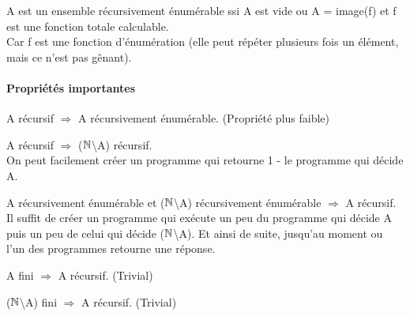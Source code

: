 \begin{myprop}
	A est un ensemble récursivement énumérable ssi A est vide ou A = image(f) et f
	est une fonction totale calculable. \\
	Car f est une fonction d'énumération (elle
	peut répéter plusieurs fois un élément, mais ce n'est pas gênant).
\end{myprop}


\paragraph{Propriétés importantes}
\label{par:propri_t_s_importantes}
\begin{myprop}
	A récursif $\Rightarrow$ A récursivement énumérable. (Propriété plus
		faible)
\end{myprop}

\begin{myprop}
	A récursif $\Rightarrow$ ($\mathbb{N}$\textbackslash A) récursif.\\ On peut facilement créer
		un programme qui retourne 1 - le programme qui décide A.
\end{myprop}

\begin{myprop}
	A récursivement énumérable et ($\mathbb{N}$\textbackslash A) récursivement énumérable
		$\Rightarrow$ A récursif.\\ Il suffit de créer un programme
		qui exécute un peu du programme qui décide A puis un peu de celui qui
		décide ($\mathbb{N}$\textbackslash A). Et ainsi de suite, jusqu'au moment ou l'un 
		des programmes retourne une réponse.
\end{myprop}

\begin{myprop}
	A fini $\Rightarrow$ A récursif. (Trivial)
\end{myprop}

\begin{myprop}
	($\mathbb{N}$\textbackslash A) fini $\Rightarrow$ A récursif. (Trivial)
\end{myprop}



